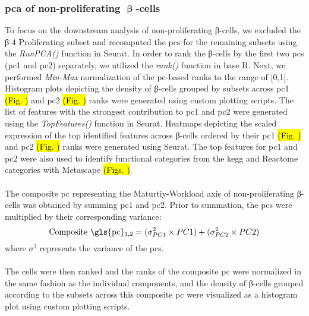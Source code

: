\subsubsection{\large \gls{pca} of non-proliferating \( \mathbf{\upbeta} \)-cells}
To focus on the downstream analysis of non-proliferating β-cells, we excluded the β-4 Proliferating subset and recomputed the \glspl{pc} for the remaining subsets using the \textit{RunPCA()} function in Seurat. In order to rank the β-cells by the first two \glspl{pc} (\gls{pc}1 and \gls{pc}2) separately, we utilized the \textit{rank()} function in base R. Next, we performed \textit{Min-Max} normalization of the \gls{pc}-based ranks to the range of [0,1]. Histogram plots depicting the density of β-cells grouped by subsets across \gls{pc}1 \hl{(Fig. )} and \gls{pc}2 \hl{(Fig. )} ranks were generated using custom plotting scripts. The list of features with the strongest contribution to  \gls{pc}1 and \gls{pc}2 were generated using the \textit{TopFeatures()} function in Seurat. Heatmaps depicting the scaled expression of the top identified features across β-cells ordered by their \gls{pc}1 \hl{(Fig. )} and \gls{pc}2 \hl{(Fig. )} ranks were generated using Seurat. The top features for \gls{pc}1 and \gls{pc}2 were also used to identify functional categories from the \gls{kegg} and Reactome categories with Metascape \textbf{\cite{zhou_metascape_2019}} \hl{(Figs. )}.\\\\
The composite \gls{pc} representing the Maturtiy-Workload axis of non-proliferating β-cells was obtained by summing \gls{pc}1 and \gls{pc}2. Prior to summation, the \glspl{pc} were multiplied by their corresponding variance:
\begin{equation}
    \text{Composite \gls{pc}\textsubscript{1,2}} = (\sigma^2_{PC1} \times PC1) + (\sigma^2_{PC2} \times PC2)
\end{equation}
where $\sigma^2$ represents the variance of the \glspl{pc}.\\\\
The cells were then ranked and the ranks of the composite \gls{pc} were normalized in the same fashion as the individual components, and the density of β-cells grouped according to the subsets across this composite \gls{pc} were visualized as a histogram plot using custom plotting scripts. 


